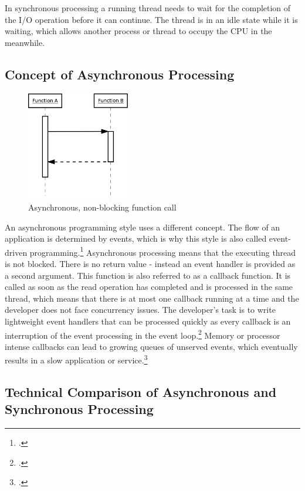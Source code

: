 In synchronous processing a running thread needs to wait for the completion of
the I/O operation before it can continue.
The thread is in an idle state while it is waiting, which allows another process 
or thread to occupy the CPU in the meanwhile.
\FloatBarrier
\subsection{Concept of Asynchronous Processing}
\label{concept_async}
\FloatBarrier

\begin{figure}[hbtp]
\centering
\includegraphics[width=0.4\textwidth]{img/asynch_call.png}
\caption{Asynchronous, non-blocking function call}
\label{fig:asynch_call}
\end{figure}

An asynchronous programming style uses a different concept. The flow of an
application is determined by events, which is why this style is also called
event-driven programming.\footcite[Cf.][16]{teixeira_2012} Asynchronous processing means
that the executing thread is not blocked. There is no
return value - instead an event handler is provided as a second argument.
This function is also referred to as a callback function. It is called as soon
as the read operation has completed and is processed in the same thread, which
means that there is at most one callback running at a time and the developer
does not face concurrency issues.
The developer’s task is to write lightweight event handlers that can be
processed quickly as every callback is an interruption of the event processing
in the event loop.\footcite[Cf.][p. 10 et sqq.]{Croucher_2012} Memory or processor intense
callbacks can lead to growing queues of unserved events, which eventually
results in a slow application or service.\footcite[Cf.][48]{teixeira_2012}


\subsection{Technical Comparison of Asynchronous and Synchronous Processing}
\label{comparison_syncasync}

